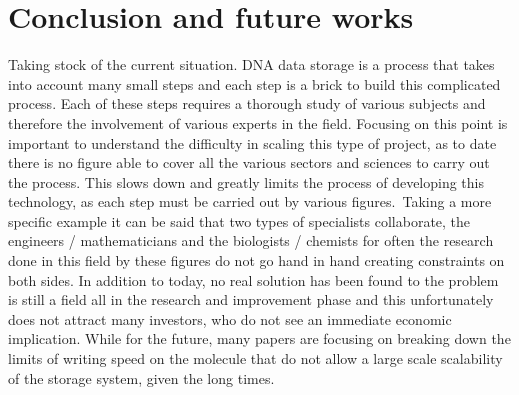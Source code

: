 \documentclass[10pt,twocolumn,twoside]{gsajnl}
\begin{document}
\section{Conclusion and future works}
Taking stock of the current situation. DNA data storage is a process that takes into account many small steps and each step is a brick to build this complicated process. Each of these steps requires a thorough study of various subjects and therefore the involvement of various experts in the field. Focusing on this point is important to understand the difficulty in scaling this type of project, as to date there is no figure able to cover all the various sectors and sciences to carry out the process. This slows down and greatly limits the process of developing this technology, as each step must be carried out by various figures.\
Taking a more specific example it can be said that two types of specialists collaborate, the engineers / mathematicians and the biologists / chemists for often the research done in this field by these figures do not go hand in hand creating constraints on both sides. In addition to today, no real solution has been found to the problem is still a field all in the research and improvement phase and this unfortunately does not attract many investors, who do not see an immediate economic implication.
While for the future, many papers are focusing on breaking down the limits of writing speed on the molecule that do not allow a large scale scalability of the storage system, given the long times.




\end{document}
